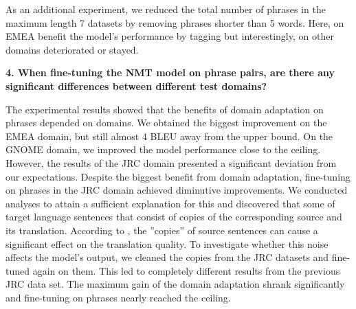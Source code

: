 As an additional experiment, we reduced the total number of phrases in the maximum length 7 datasets by removing phrases shorter than 5 words. Here, on EMEA benefit the model's performance by tagging but interestingly, on other domains deteriorated or stayed. 

\bigskip

\noindent \textbf{4. When fine-tuning the NMT model on phrase pairs, are there any significant differences between different test domains?}

\bigskip

The experimental results showed that the benefits of domain adaptation on phrases depended on domains. We obtained the biggest improvement on the EMEA domain, but still almost 4 BLEU away from the upper bound. On the GNOME domain, we improved the model performance close to the ceiling. However, the results of the JRC domain presented a significant deviation from our expectations. Despite the biggest benefit from domain adaptation, fine-tuning on phrases in the JRC domain achieved diminutive improvements. We conducted analyses to attain a sufficient explanation for this and discovered that some of target language sentences that consist of copies of the corresponding source and its translation. 
According to \cite{pmlr-v80-ott18a}, the ''copies'' of source sentences can cause a significant effect on the translation quality. To investigate whether this noise affects the model's output, we cleaned the copies from the JRC datasets and fine-tuned again on them. This led to completely different results from the previous JRC data set. The maximum gain of the domain adaptation shrank significantly and fine-tuning on phrases nearly reached the ceiling. 

